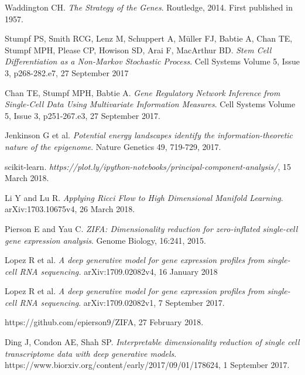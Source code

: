\documentclass[journal, a4paper]{IEEEtran}
\begin{document}
\begin{thebibliography}{99}
	
	Waddington CH. \textit{The Strategy of the Genes}. Routledge, 2014. First published in 1957. 
	
	Stumpf PS, Smith RCG, Lenz M, Schuppert A, M{\"u}ller FJ, Babtie A,
	Chan TE, Stumpf MPH, Please CP, Howison SD, Arai F, MacArthur BD. \textit{Stem Cell Differentiation as a Non-Markov Stochastic Process}. Cell Systems Volume 5, Issue 3, p268-282.e7, 27 September 2017 
	
	Chan TE, Stumpf MPH, Babtie A. \textit{Gene Regulatory Network Inference from Single-Cell Data Using Multivariate Information Measures}. Cell Systems Volume 5, Issue 3, p251-267.e3, 27 September 2017.
	
	Jenkinson G et al. \textit{Potential energy landscapes identify the information-theoretic nature of the epigenome}.
	Nature Genetics 49, 719-729, 2017.
	
	scikit-learn. \textit{https://plot.ly/ipython-notebooks/principal-component-analysis/}, 15 March 2018.
	
%	
	
	
	Li Y and Lu R. \textit{Applying Ricci Flow to High Dimensional Manifold Learning}.
	arXiv:1703.10675v4, 26 March 2018.
		
	Pierson E and Yau C. \textit{ZIFA: Dimensionality reduction for zero-inflated single-cell gene expression analysis}.
	Genome Biology, 16:241, 2015.
	
	Lopez R et al. \textit{A deep generative model for gene expression profiles from single-cell RNA sequencing.}
	arXiv:1709.02082v4, 16 January 2018
	
	Lopez R et al. \textit{A deep generative model for gene expression profiles from single-cell RNA sequencing}.
	arXiv:1709.02082v1, 7 September 2017.
	
	https://github.com/epierson9/ZIFA, 27 February 2018.
	
	Ding J, Condon AE, Shah SP. \textit{Interpretable dimensionality reduction of single cell transcriptome data with deep generative models}.
	https://www.biorxiv.org/content/early/2017/09/01/178624, 1 September 2017.
	

\end{thebibliography}
\end{document}
